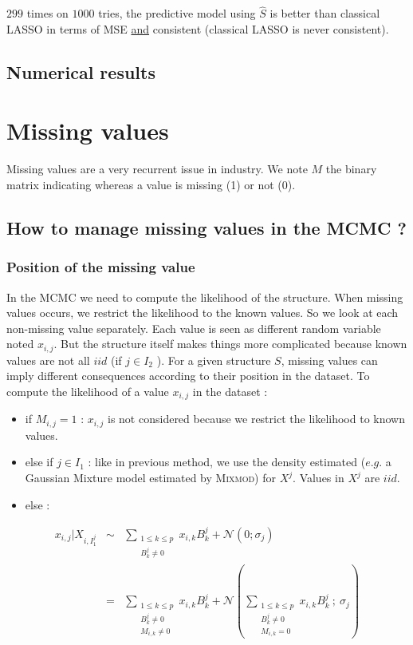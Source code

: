 \documentclass[11pt,a4paper]{report}
\begin{document}
		
		$299$ times on $1000$ tries, the predictive model using $\hat{S}$ is better than classical LASSO in terms of MSE \underline{and} consistent (classical LASSO is never consistent).
		

	\section{Numerical results}

\chapter{Missing values}
	Missing values are a very recurrent issue in industry. We note $M$ the binary matrix indicating whereas a value is missing (1) or not (0).
	\section{How to manage missing values in the MCMC ?}
			\subsection{Position of the missing value}

		In the MCMC we need to compute the likelihood of the structure. When missing values occurs, we restrict the likelihood to the known values. So we look at each non-missing value separately. Each value is seen as different random variable noted $x_{i,j}$.  But the structure itself makes things more complicated because known values are not all $iid$ (if $j \in I_2$ ).
			For a given structure $S$, missing values can imply different consequences according to their position in the dataset.
			To compute the likelihood of a value $x_{i,j}$ in the dataset :
			\begin{itemize}
				\item if $M_{i,j}=1$ : $x_{i,j}$ is not considered because we restrict the likelihood to known values.
				\item else if $j \in I_1$ : like in previous method, we use the density estimated  ($e.g.$ a Gaussian Mixture model estimated by \textsc{Mixmod}) for $X^j$. Values in $X^j$ are $iid$.
				\item else :
			\end{itemize}
			\begin{eqnarray}
				x_{i,j}| X_{i,I_1^j} &\sim & \sum_{\substack{1\leq k \leq p \\B_k^j\neq 0 } } x_{i,k}B_k^j  + \mathcal{N}(0;\sigma_j) \\
				&=& \sum_{\substack{1\leq k \leq p \\B_k^j\neq 0 \\ M_{i,k}\neq 0 } } x_{i,k}B_k^j  + \mathcal{N}(\sum_{\substack{1\leq k \leq p \\B_k^j\neq 0 \\ M_{i,k}= 0 } } x_{i,k}B_k^j \ ; \ \sigma_j) \label{Missingdensity}\\ 
			\end{eqnarray}
			
\end{document}
